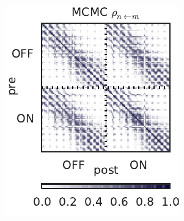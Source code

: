 \begin{figure}[t!]
\begin{subfigure}[b]{1.8in}
    \includegraphics[width=\textwidth]{figures/ch5/synth_rgc_mcmc_prob_conn.pdf}
    \label{fig:synth_rgc_mcmc_prob_conn}
  \end{subfigure}
  ~
  \begin{subfigure}[b]{1.8in}
    \centering
    \caption{}
    \vspace{-.25in}

\end{subfigure}
\end{figure}
